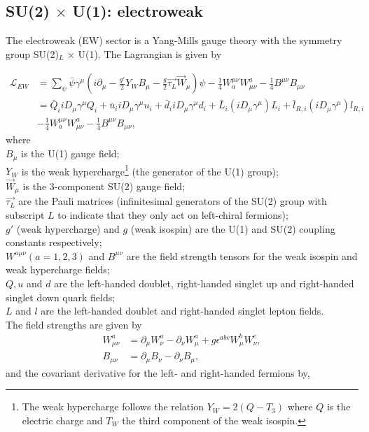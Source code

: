 \subsection{SU(2) $\times$ U(1): electroweak}
\label{subsec:ew}
The electroweak (EW) sector is a Yang-Mills gauge theory with the symmetry group SU(2)$_L$ $\times$ U(1). The Lagrangian is given by

\begin{equation}
\label{eq:EW}
\begin{split}
\mathcal{L}_{EW} &= \sum_{\psi} \bar{\psi} \gamma^\mu \left(i\partial_\mu -  \frac{g'}{2}Y_W B_\mu - \frac{g}{2} \overrightarrow{\tau_L} \overrightarrow{W}_\mu \right) \psi - \frac{1}{4} W^{\mu\nu}_a W^{a}_{\mu\nu} -\frac{1}{4} B^{\mu\nu} B_{\mu\nu} \\ 
&= \bar{Q}_i i D_\mu \gamma^\mu Q_i + \bar{u}_i i D_\mu \gamma^\mu u_i + \bar{d}_i i D_\mu \gamma^\mu d_i + \bar{L}_i\left(iD_\mu\gamma^\mu\right)L_i + \bar{l}_{R,i}\left(iD_\mu\gamma^\mu\right)l_{R,i} \\ &
- \frac{1}{4} W^{\mu\nu}_a W^{a}_{\mu\nu} -\frac{1}{4} B^{\mu\nu} B_{\mu\nu},
\end{split}
\end{equation}
where\\
\indent $B_\mu$ is the U(1) gauge field;\\
\indent $Y_W$ is the weak hypercharge\footnote{The weak hypercharge follows the relation $Y_W = 2\left(Q-T_3\right)$ where $Q$ is the electric charge and $T_W$ the third component of the weak isospin.} (the generator of the U(1) group);\\
\indent $\overrightarrow{W}_\mu$ is the 3-component SU(2) gauge field;\\
\indent $\overrightarrow{\tau_L}$ are the Pauli matrices (infinitesimal generators of the SU(2) group with subscript $L$ to indicate that they only act on left-chiral fermions);\\
\indent $g'$ (weak hypercharge) and $g$ (weak isospin) are the U(1) and SU(2) coupling constants respectively;\\
\indent $W^{a\mu\nu} (a=1,2,3)$ and $B^{\mu\nu}$ are the field strength tensors for the weak isospin and weak hypercharge fields;\\
\indent $Q, u$ and $d$ are the left-handed doublet, right-handed singlet up and right-handed singlet down quark fields;\\
\indent $L$ and $l$ are the left-handed doublet and right-handed singlet lepton fields.\newline
\\
\noindent The field strengths are given by
\begin{equation*}
\begin{split}
W^a_{\mu\nu} &= \partial_\mu W^a_\nu - \partial_\nu W^a_\mu + g \epsilon^{abc}W^b_\mu W^c_\nu,\\
B_{\mu\nu} &= \partial_\mu B_\nu - \partial_\nu B_\mu,
\end{split}
\end{equation*}
\noindent and the covariant derivative for the left- and right-handed fermions by,

